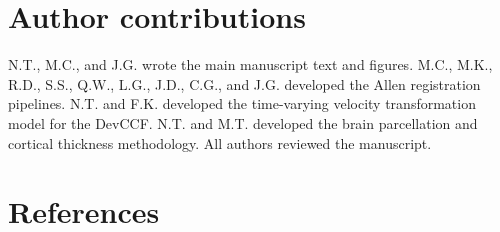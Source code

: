 \documentclass[
  12pt,
]{article}
\begin{document}
\hypertarget{author-contributions}{%
\section*{Author contributions}\label{author-contributions}}

N.T., M.C., and J.G. wrote the main manuscript text and figures. M.C.,
M.K., R.D., S.S., Q.W., L.G., J.D., C.G., and J.G. developed the Allen
registration pipelines. N.T. and F.K. developed the time-varying
velocity transformation model for the DevCCF. N.T. and M.T. developed
the brain parcellation and cortical thickness methodology. All authors
reviewed the manuscript. \clearpage

\hypertarget{references}{%
\section*{References}\label{references}}
\end{document}
